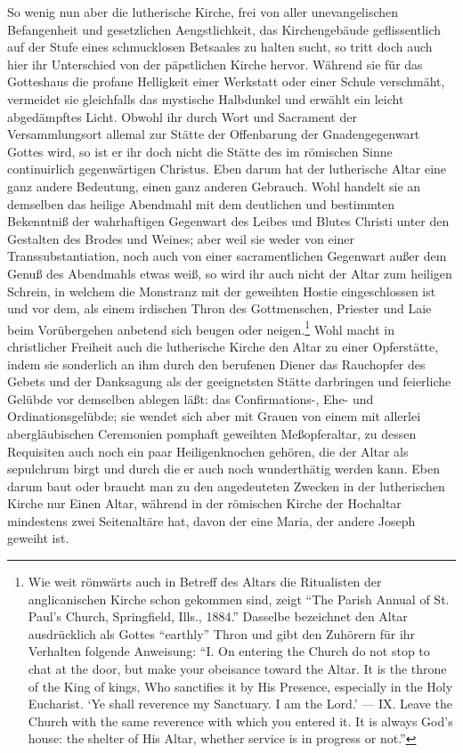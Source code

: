 So wenig nun aber die lutherische Kirche, frei von aller unevangelischen Befangenheit und gesetzlichen Aengstlichkeit, das Kirchengebäude geflissentlich auf
der Stufe eines schmucklosen Betsaales zu halten sucht, so tritt doch auch hier ihr Unterschied von der päpstlichen Kirche hervor. Während sie für das Gotteshaus die profane Helligkeit einer Werkstatt oder einer Schule verschmäht, vermeidet sie gleichfalls das mystische Halbdunkel und erwählt ein leicht abgedämpftes Licht. Obwohl ihr durch Wort und Sacrament der Versammlungsort allemal zur Stätte der Offenbarung der Gnadengegenwart Gottes wird, so ist er ihr doch nicht die Stätte des im römischen Sinne continuirlich gegenwärtigen Christus. Eben darum hat der lutherische Altar eine ganz andere Bedeutung, einen ganz anderen Gebrauch. Wohl handelt sie an demselben das heilige Abendmahl mit dem deutlichen und bestimmten Bekenntniß der wahrhaftigen Gegenwart des Leibes und Blutes Christi unter den Gestalten des Brodes und Weines; aber weil sie weder von einer Transsubstantiation, noch auch von einer sacramentlichen Gegenwart außer dem Genuß des Abendmahls etwas weiß, so wird ihr auch nicht der Altar zum heiligen Schrein, in welchem die Monstranz mit der geweihten Hostie eingeschlossen ist und vor dem, als einem irdischen Thron des Gottmenschen, Priester und Laie beim Vorübergehen anbetend sich beugen oder neigen.\footnote{Wie weit römwärts auch in Betreff des Altars die Ritualisten der anglicanischen Kirche schon gekommen sind, zeigt “The Parish Annual of St. Paul’s Church, Springfield, Ills., 1884.” Dasselbe bezeichnet den Altar ausdrücklich als Gottes “earthly” Thron und gibt den Zuhörern für ihr Verhalten folgende Anweisung: “I. On entering the Church do not stop to chat at the door, but make your obeisance toward the Altar. It is the throne of the King of kings, Who sanctifies it by His Presence, especially in the Holy Eucharist. ‘Ye shall reverence my Sanctuary. I am the Lord.’ — IX. Leave the Church with the same reverence with which you entered it. It is always God’s house: the shelter of His Altar, whether service is in progress or not.”} Wohl macht in christlicher Freiheit auch die lutherische Kirche den Altar zu einer Opferstätte, indem sie sonderlich an ihm durch den berufenen Diener das Rauchopfer des Gebets und der Danksagung als der geeignetsten Stätte darbringen und feierliche Gelübde vor demselben ablegen läßt: das Confirmations-, Ehe- und Ordinationsgelübde; sie wendet sich aber mit Grauen von einem mit allerlei abergläubischen Ceremonien pomphaft geweihten Meßopferaltar, zu dessen Requisiten auch noch ein paar Heiligenknochen gehören, die der Altar als sepulchrum birgt und durch die er auch noch wunderthätig werden kann. Eben darum baut oder braucht man zu den angedeuteten Zwecken in der lutherischen Kirche nur Einen Altar, während in der römischen Kirche der Hochaltar mindestens zwei Seitenaltäre hat, davon der eine Maria, der andere Joseph geweiht ist.


